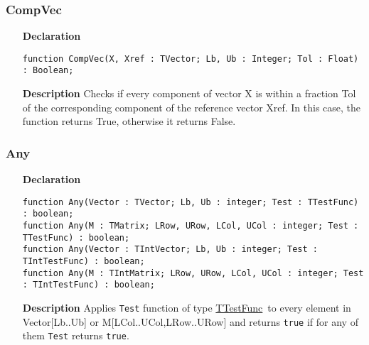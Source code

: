 \documentclass[12pt,a4paper,oneside]{report}
\newcommand{\declarationitem}[1]{\textbf{#1}}
\newcommand{\descriptiontitle}[1]{\textbf{#1}}
\newcommand{\code}[1]{\texttt{#1}}
\begin{document}
\subsubsection{CompVec}
\label{uvectutils:compvec}
\begin{itemize}
	\item[\declarationitem{Declaration}\hfill]
\begin{flushleft}\code{function CompVec(X, Xref : TVector; Lb, Ub  : Integer; Tol : Float) : Boolean;}
\end{flushleft}\item[\descriptiontitle{Description}]
 Checks if every component of vector X is within a fraction Tol of
the corresponding component of the reference vector Xref. In this
case, the function returns True, otherwise it returns False.
\end{itemize}
\subsubsection{Any}
\begin{itemize}
	\item[\declarationitem{Declaration}\hfill]
\begin{flushleft}
	\code{function Any(Vector : TVector; Lb, Ub : integer; Test : TTestFunc) : boolean;\\ \vspace{4pt}
	function Any(M : TMatrix; LRow, URow, LCol, UCol : integer; Test : TTestFunc) : boolean;\\ \vspace{4pt}
	function Any(Vector : TIntVector; Lb, Ub : integer; Test : TIntTestFunc) : boolean;\\ \vspace{4pt}
	function Any(M : TIntMatrix; LRow, URow, LCol, UCol : integer; Test : TIntTestFunc) : boolean;}
\end{flushleft}	
\item[\descriptiontitle{Description}]
Applies \code{Test} function of type \hyperref[uvecutils:ttestfunc]{TTestFunc}\ to every element in Vector[Lb..Ub] or M[LCol..UCol,LRow..URow] and returns \code{true} if for any of them \code{Test} returns \code{true}.
\end{itemize}
\end{document}
